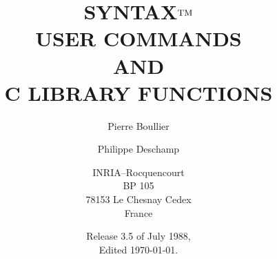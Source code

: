 \documentclass[a4paper]{report}  %
\title{
		{\huge S}YNTAX$^{\mbox{\rm \small TM}}$    \\[20pt]
		USER COMMANDS		\\
		AND			\\
		C LIBRARY FUNCTIONS
}
\author{
		Pierre Boullier
	\and
		Philippe Deschamp
	\and
		INRIA--Rocquencourt		\\
		BP 105				\\
		78153 Le Chesnay Cedex		\\
		France
}
\date{
		Release 3.5 of July 1988, \\
		Edited \today.
}
\begin{document}
\maketitle

\newpage
~
\end{document}

